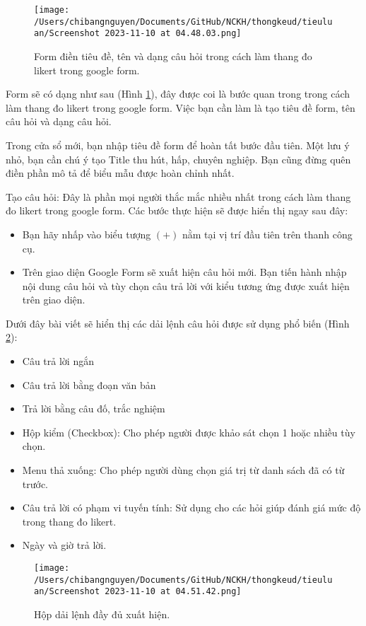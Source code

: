 \documentclass[12pt]{article}
\begin{document}
\begin{figure}
    \centering
    \texttt{[image: /Users/chibangnguyen/Documents/GitHub/NCKH/thongkeud/tieuluan/Screenshot 2023-11-10 at 04.48.03.png]}
    \caption{Form điền tiêu đề, tên và dạng câu hỏi trong cách làm thang đo likert trong google form.}
    \label{2}
\end{figure}

Form sẽ có dạng như sau (Hình \ref{2}), đây được coi là bước quan trong trong cách làm thang đo likert trong google form. Việc bạn cần làm là tạo tiêu đề form, tên câu hỏi và dạng câu hỏi. 

Trong cửa sổ mới, bạn nhập tiêu đề form để hoàn tất bước đầu tiên. Một lưu ý nhỏ, bạn cần chú ý tạo Title thu hút, hấp, chuyên nghiệp. Bạn cũng đừng quên điền phần mô tả để biểu mẫu được hoàn chỉnh nhất. 

Tạo câu hỏi: Đây là phần mọi người thắc mắc nhiều nhất trong cách làm thang đo likert trong google form. Các bước thực hiện sẽ được hiển thị ngay sau đây:

\begin{itemize}
\item Bạn hãy nhấp vào biểu tượng $(+)$ nằm tại vị trí đầu tiên trên thanh công cụ. 
\item Trên giao diện Google Form sẽ xuất hiện câu hỏi mới. Bạn tiến hành nhập nội dung câu hỏi và tùy chọn câu trả lời với kiểu tương ứng được xuất hiện trên giao diện.
\end{itemize}

Dưới đây bài viết sẽ hiển thị các dải lệnh câu hỏi được sử dụng phổ biến (Hình \ref{3}):

\begin{itemize}
\item Câu trả lời ngắn 
\item Câu trả lời bằng đoạn văn bản
\item Trả lời bằng câu đố, trắc nghiệm 
\item Hộp kiểm (Checkbox): Cho phép người được khảo sát chọn 1 hoặc nhiều tùy chọn. 
\item Menu thả xuống: Cho phép người dùng chọn giá trị từ danh sách đã có từ trước. 
\item Câu trả lời có phạm vi tuyến tính: Sử dụng cho các hỏi giúp đánh giá mức độ trong thang đo likert. 
\item Ngày và giờ trả lời.
\end{itemize}

\begin{figure}
    \centering
    \texttt{[image: /Users/chibangnguyen/Documents/GitHub/NCKH/thongkeud/tieuluan/Screenshot 2023-11-10 at 04.51.42.png]}
    \caption{Hộp dải lệnh đầy đủ xuất hiện.}
    \label{3}
\end{figure}
\end{document}
